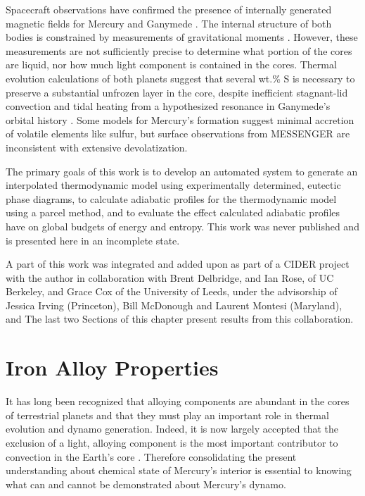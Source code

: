 Spacecraft observations have confirmed the presence of internally generated
magnetic fields for Mercury \citep{Anderson2011} and Ganymede \cite{Kivelson1996}.
The internal structure of both bodies is constrained by measurements of
gravitational moments \citep{Smith2012,Hauck2006}. However, these measurements are
not sufficiently precise to determine what portion of the cores are liquid, nor
how much light component is contained in the cores. Thermal evolution
calculations of both planets \citep{Hauck2004,Hauck2006,Breuer2007,Bland2008} suggest
that several wt.\% S is necessary to preserve a substantial unfrozen layer in
the core, despite inefficient stagnant-lid convection
\citep{Solomatov2000,Hauck2004,Breuer2007} and tidal heating from a hypothesized
resonance in Ganymede's orbital history \citep{Showman1997,Bland2008}. Some models
for Mercury's formation suggest minimal accretion of volatile elements like
sulfur, but surface observations from MESSENGER \citep{Nittler2011,Mccubbin2012} are
inconsistent with extensive devolatization.

The primary goals of this work is to develop an automated system to generate an
interpolated thermodynamic model using experimentally determined, eutectic
phase diagrams, to calculate adiabatic profiles for the thermodynamic model
using a parcel method, and to evaluate the effect calculated adiabatic profiles
have on global budgets of energy and entropy. This work was never published and
is presented here in an incomplete state.

A part of this work was integrated and added upon as part of a CIDER project with the
author in collaboration with Brent Delbridge, and Ian Rose, of UC Berkeley, and Grace
Cox of the University of Leeds, under the advisorship of Jessica Irving (Princeton),
Bill McDonough and Laurent Montesi (Maryland), and  The last two Sections of this
chapter present results from this collaboration.

\section{Iron Alloy Properties}

It has long been recognized that alloying components are abundant in the cores
of terrestrial planets and that they must play an important role in thermal
evolution and dynamo generation. Indeed, it is now largely accepted that the
exclusion of a light, alloying component is the most important contributor to
convection in the Earth’s core \citep{Lister1995}. Therefore
consolidating the present understanding about chemical state of Mercury’s
interior is essential to knowing what can and cannot be demonstrated about
Mercury’s dynamo.

